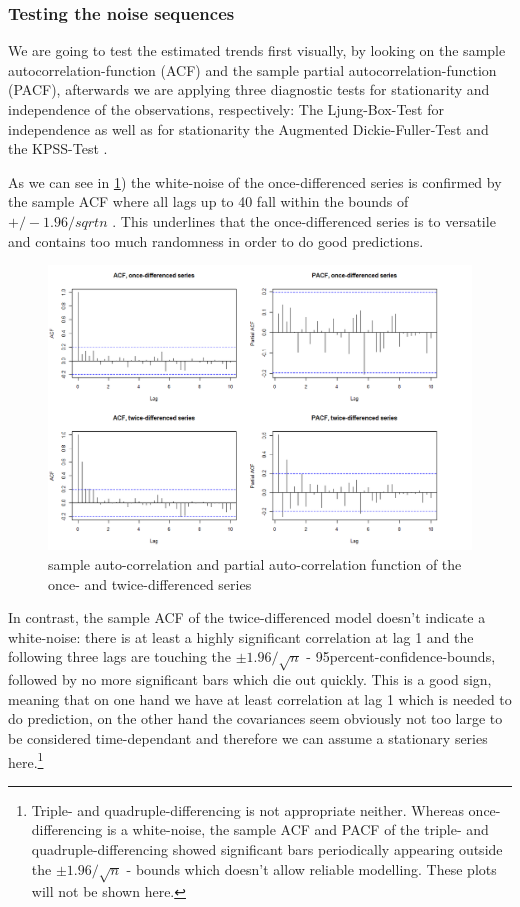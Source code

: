 \documentclass[11pt,a4paper]{article}
\begin{document}
\subsubsection{Testing the noise sequences}

We are going to test the estimated trends first visually, by looking on the sample autocorrelation-function (ACF) and the sample partial autocorrelation-function (PACF), afterwards we are applying three diagnostic tests for stationarity and independence of the observations, respectively:
The Ljung-Box-Test \citep{LjungBox78} for independence as well as for stationarity the Augmented Dickie-Fuller-Test \citep{adf} and the KPSS-Test \citep{kpss92}.

As we can see in \cref{fig:diff12_acf_pacf}) the white-noise of the once-differenced series is confirmed by the sample ACF where all lags up to 40 fall within the bounds of $+/-1.96/sqrt{n}$ \cite[p.~39]{bd02}.
This underlines that the once-differenced series is to versatile and contains too much randomness in order to do good predictions.

\begin{figure}
    \centering
    \includegraphics[width=1\textwidth]{diff12_acf_pacf}
    \caption{sample auto-correlation and partial auto-correlation function of the once- and twice-differenced series}
    \label{fig:diff12_acf_pacf}
\end{figure}

In contrast, the sample ACF of the twice-differenced model doesn't indicate a white-noise: there is at least a highly significant correlation at lag 1 and the following three lags are touching the $\pm 1.96 / \sqrt{n}$ - 95percent-confidence-bounds, followed by no more significant bars which die out quickly.
This is a good sign, meaning that on one hand we have at least correlation at lag 1 which is needed to do prediction, on the other hand the covariances seem obviously not too large to be considered time-dependant and therefore we can assume a stationary series here.\footnote{
    Triple- and quadruple-differencing is not appropriate neither.
    Whereas once-differencing is a white-noise, the sample ACF and PACF of the triple- and quadruple-differencing showed significant bars periodically appearing outside the $\pm 1.96 / \sqrt{n}$ - bounds which doesn't allow reliable modelling.
    These plots will not be shown here.
}
\end{document}
